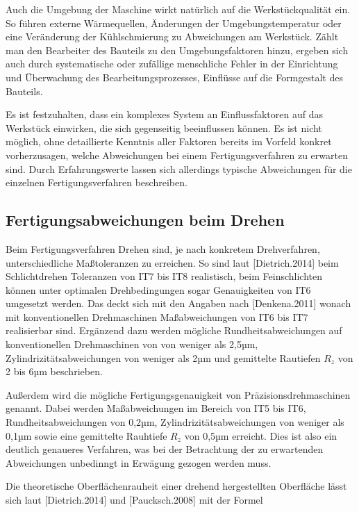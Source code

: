 Auch die Umgebung der Maschine wirkt natürlich auf die Werkstückqualität ein. So führen externe Wärmequellen, Änderungen der Umgebungstemperatur oder eine Veränderung der Kühlschmierung zu Abweichungen am Werkstück. Zählt man den Bearbeiter des Bauteils zu den Umgebungsfaktoren hinzu, ergeben sich auch durch systematische oder zufällige menschliche Fehler in der Einrichtung und Überwachung des Bearbeitungsprozesses, Einflüsse auf die Formgestalt des Bauteils. 

Es ist festzuhalten, dass ein komplexes System an Einflussfaktoren auf das Werkstück einwirken, die sich gegenseitig beeinflussen können. Es ist nicht möglich, ohne detaillierte Kenntnis aller Faktoren bereits im Vorfeld konkret vorherzusagen, welche Abweichungen bei einem Fertigungsverfahren zu erwarten sind. Durch Erfahrungswerte lassen sich allerdings typische Abweichungen für die einzelnen Fertigungsverfahren beschreiben. 

\subsection {Fertigungsabweichungen beim Drehen}

Beim Fertigungsverfahren Drehen sind, je nach konkretem Drehverfahren, unterschiedliche Maßtoleranzen zu erreichen. So sind laut [Dietrich.2014] beim Schlichtdrehen Toleranzen von IT7 bis IT8 realistisch, beim Feinschlichten können unter optimalen Drehbedingungen sogar Genauigkeiten von IT6 umgesetzt werden. Das deckt sich mit den Angaben nach [Denkena.2011] wonach mit konventionellen Drehmaschinen Maßabweichungen von IT6 bis IT7 realisierbar sind. Ergänzend dazu werden mögliche Rundheitsabweichungen auf konventionellen Drehmaschinen von von weniger als 2,5µm, Zylindrizitätsabweichungen von weniger als 2µm und gemittelte Rautiefen $R_{z}$ von 2 bis 6µm beschrieben. 

Außerdem wird die mögliche Fertigungsgenauigkeit von Präzisionsdrehmaschinen genannt. Dabei werden Maßabweichungen im Bereich von IT5 bis IT6, Rundheitsabweichungen von 0,2µm, Zylindrizitätsabweichungen von weniger als 0,1µm sowie eine gemittelte Rauhtiefe $R_{z}$ von 0,5µm erreicht. Dies ist also ein deutlich genaueres Verfahren, was bei der Betrachtung der zu erwartenden Abweichungen unbedinngt in Erwägung gezogen werden muss. 

Die theoretische Oberflächenrauheit einer drehend hergestellten Oberfläche lässt sich laut [Dietrich.2014] und [Paucksch.2008] mit der Formel 

